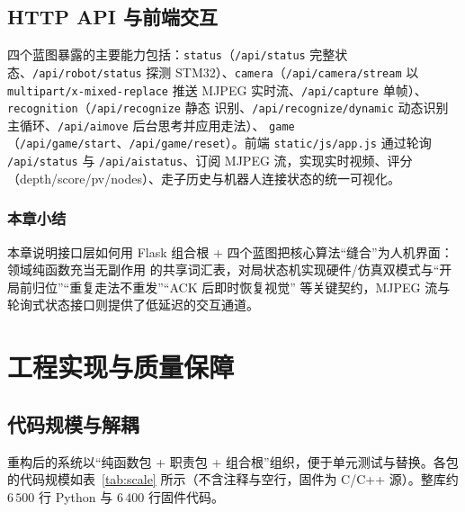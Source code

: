 \documentclass[UTF8, a4paper, 11pt, openany]{ctexbook}
\renewcommand{\_}{\textunderscore\allowbreak}
\begin{document}
\section{HTTP API 与前端交互}
四个蓝图暴露的主要能力包括：\texttt{status}（\texttt{/api/status} 完整状态、\texttt{/api/robot/status}
探测 STM32）、\texttt{camera}（\texttt{/api/camera/stream} 以 \texttt{multipart/x-mixed-replace}
推送 MJPEG 实时流、\texttt{/api/capture} 单帧）、\texttt{recognition}（\texttt{/api/recognize} 静态
识别、\texttt{/api/recognize/dynamic} 动态识别主循环、\texttt{/api/ai\_move} 后台思考并应用走法）、
\texttt{game}（\texttt{/api/game/start}、\texttt{/api/game/reset}）。前端 \texttt{static/js/app.js}
通过轮询 \texttt{/api/status} 与 \texttt{/api/ai\_status}、订阅 MJPEG 流，实现实时视频、评分
（depth/score/pv/nodes）、走子历史与机器人连接状态的统一可视化。

\subsection*{本章小结}
本章说明接口层如何用 Flask 组合根 + 四个蓝图把核心算法“缝合”为人机界面：领域纯函数充当无副作用
的共享词汇表，对局状态机实现硬件/仿真双模式与“开局前归位”“重复走法不重发”“ACK 后即时恢复视觉”
等关键契约，MJPEG 流与轮询式状态接口则提供了低延迟的交互通道。

\chapter{工程实现与质量保障}
\label{ch:eng}

\section{代码规模与解耦}
\label{sec:scale}
重构后的系统以“纯函数包 + 职责包 + 组合根”组织，便于单元测试与替换。各包的代码规模如表~\ref{tab:scale}
所示（不含注释与空行，固件为 C/C++ 源）。整库约 $6\,500$ 行 Python 与 $6\,400$ 行固件代码。
\end{document}
